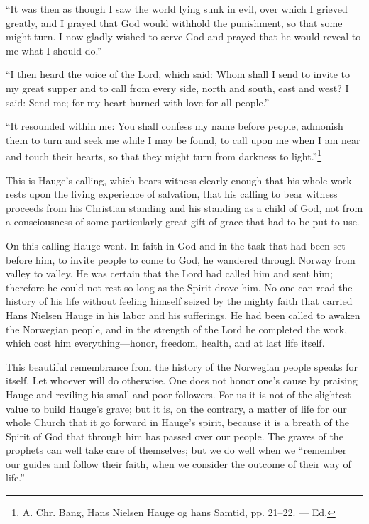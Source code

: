“It was then as though I saw the world lying sunk in evil, over which I grieved greatly, and I prayed that God would withhold the punishment, so that some might turn. I now gladly wished to serve God and prayed that he would reveal to me what I should do.”

“I then heard the voice of the Lord, which said: Whom shall I send to invite to my great supper and to call from every side, north and south, east and west? I said: Send me; for my heart burned with love for all people.”

“It resounded within me: You shall confess my name before people, admonish them to turn and seek me while I may be found, to call upon me when I am near and touch their hearts, so that they might turn from darkness to light.”\footnote{A. Chr. Bang, Hans Nielsen Hauge og hans Samtid, pp. 21–22. — Ed.}

This is Hauge’s calling, which bears witness clearly enough that his whole work rests upon the living experience of salvation, that his calling to bear witness proceeds from his Christian standing and his standing as a child of God, not from a consciousness of some particularly great gift of grace that had to be put to use.

On this calling Hauge went. In faith in God and in the task that had been set before him, to invite people to come to God, he wandered through Norway from valley to valley. He was certain that the Lord had called him and sent him; therefore he could not rest so long as the Spirit drove him. No one can read the history of his life without feeling himself seized by the mighty faith that carried Hans Nielsen Hauge in his labor and his sufferings. He had been called to awaken the Norwegian people, and in the strength of the Lord he completed the work, which cost him everything—honor, freedom, health, and at last life itself.

This beautiful remembrance from the history of the Norwegian people speaks for itself. Let whoever will do otherwise. One does not honor one’s cause by praising Hauge and reviling his small and poor followers. For us it is not of the slightest value to build Hauge’s grave; but it is, on the contrary, a matter of life for our whole Church that it go forward in Hauge’s spirit, because it is a breath of the Spirit of God that through him has passed over our people. The graves of the prophets can well take care of themselves; but we do well when we “remember our guides and follow their faith, when we consider the outcome of their way of life.”

